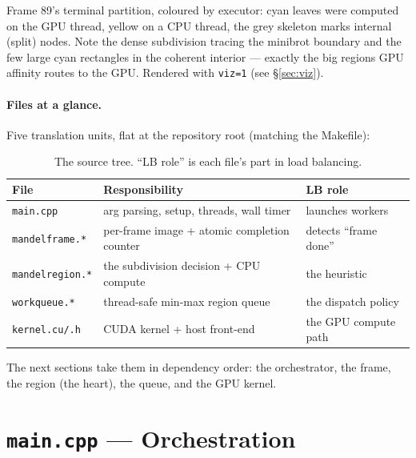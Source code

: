 \documentclass[
	english,
	letterpaper, oneside
]{article}
\begin{document}
            {Frame 89's terminal partition, coloured by executor: cyan leaves were
             computed on the GPU thread, yellow on a CPU thread, the grey skeleton
             marks internal (split) nodes. Note the dense subdivision tracing the
             minibrot boundary and the few large cyan rectangles in the coherent
             interior --- exactly the big regions GPU affinity routes to the GPU.
             Rendered with \texttt{viz=1} (see \S\ref{sec:viz}).
             \label{fig:partition}}

\paragraph{Files at a glance.} Five translation units, flat at the repository
root (matching the Makefile):

\begin{table}[H]
    \centering
    \caption{The source tree. ``LB role'' is each file's part in load balancing.}
    \label{tab:files}
    \begin{tabular}{lll}
        \hline
        File & Responsibility & LB role \\
        \hline
        \texttt{main.cpp}        & arg parsing, setup, threads, wall timer & launches workers \\
        \texttt{mandelframe.*}   & per-frame image + atomic completion counter & detects ``frame done'' \\
        \texttt{mandelregion.*}  & the subdivision decision + CPU compute & the heuristic \\
        \texttt{workqueue.*}     & thread-safe min-max region queue & the dispatch policy \\
        \texttt{kernel.cu/.h}    & CUDA kernel + host front-end & the GPU compute path \\
        \hline
    \end{tabular}
\end{table}

The next sections take them in dependency order: the orchestrator, the frame, the
region (the heart), the queue, and the GPU kernel.

\section{\texttt{main.cpp} --- Orchestration}
\end{document}
